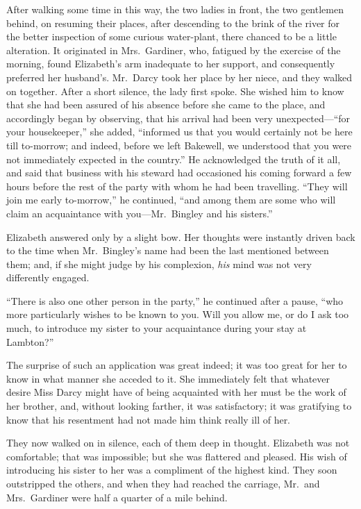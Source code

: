 \documentclass[12pt,english,oneside]{book}
\begin{document}
After walking some time in this way, the two ladies in front, the
two gentlemen behind, on resuming their places, after descending to
the brink of the river for the better inspection of some curious water-plant,
there chanced to be a little alteration. It originated in Mrs.\ Gardiner,
who, fatigued by the exercise of the morning, found Elizabeth's arm
inadequate to her support, and consequently preferred her husband's.
Mr.\ Darcy took her place by her niece, and they walked on together.
After a short silence, the lady first spoke. She wished him to know
that she had been assured of his absence before she came to the place,
and accordingly began by observing, that his arrival had been very
unexpected\mbox{---}{}``for your housekeeper,'' she added, {}``informed
us that you would certainly not be here till to-morrow; and indeed,
before we left Bakewell, we understood that you were not immediately
expected in the country.'' He acknowledged the truth of it all, and
said that business with his steward had occasioned his coming forward
a few hours before the rest of the party with whom he had been travelling.
{}``They will join me early to-morrow,'' he continued, {}``and
among them are some who will claim an acquaintance with you\mbox{---}Mr.\ Bingley
and his sisters.''

Elizabeth answered only by a slight bow. Her thoughts were instantly
driven back to the time when Mr.\ Bingley's name had been the last
mentioned between them; and, if she might judge by his complexion,
\textit{his} mind was not very differently engaged.

{}``There is also one other person in the party,'' he continued
after a pause, {}``who more particularly wishes to be known to you.
Will you allow me, or do I ask too much, to introduce my sister to
your acquaintance during your stay at Lambton?''\ 

The surprise of such an application was great indeed; it was too great
for her to know in what manner she acceded to it. She immediately
felt that whatever desire Miss Darcy might have of being acquainted
with her must be the work of her brother, and, without looking farther,
it was satisfactory; it was gratifying to know that his resentment
had not made him think really ill of her.

They now walked on in silence, each of them deep in thought. Elizabeth
was not comfortable; that was impossible; but she was flattered and
pleased. His wish of introducing his sister to her was a compliment
of the highest kind. They soon outstripped the others, and when they
had reached the carriage, Mr.\ and Mrs.\ Gardiner were half a quarter
of a mile behind.
\end{document}
